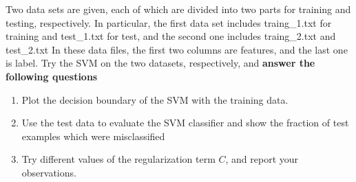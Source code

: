 \documentclass[10pt,a4paper]{article}
\begin{document}
  Two data sets are given, each of which are divided into two parts for training and testing, respectively. In particular, the first data set includes \textsf{traing\_1.txt} for training and \textsf{test\_1.txt} for test, and the second one includes \textsf{traing\_2.txt} and \textsf{test\_2.txt} In these data files, the first two columns are features, and the last one is label. Try the SVM on the two datasets, respectively, and \textbf{answer the following questions}
  \begin{enumerate}
    \item Plot the decision boundary of the SVM with the training data.
    \item Use the test data to evaluate the SVM classifier and show the fraction of test examples which were misclassified
    \item Try different values of the regularization term $C$, and report your observations.
  \end{enumerate}
\end{document}
